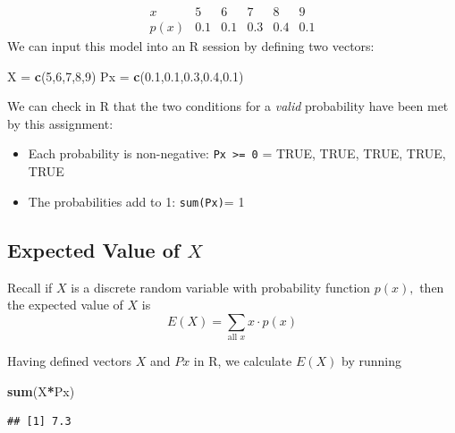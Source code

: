 \documentclass[
]{book}
\newenvironment{Shaded}{\begin{snugshade}}{\end{snugshade}}
\newcommand{\DecValTok}[1]{\textcolor[rgb]{0.00,0.00,0.81}{#1}}
\newcommand{\FloatTok}[1]{\textcolor[rgb]{0.00,0.00,0.81}{#1}}
\newcommand{\FunctionTok}[1]{\textcolor[rgb]{0.13,0.29,0.53}{\textbf{#1}}}
\newcommand{\NormalTok}[1]{#1}
\newcommand{\OtherTok}[1]{\textcolor[rgb]{0.56,0.35,0.01}{#1}}
\newcommand{\SpecialCharTok}[1]{\textcolor[rgb]{0.81,0.36,0.00}{\textbf{#1}}}
\providecommand{\tightlist}{%
  \setlength{\itemsep}{0pt}\setlength{\parskip}{0pt}}
\theoremstyle{definition}
\theoremstyle{definition}
\theoremstyle{definition}
\theoremstyle{definition}
\theoremstyle{remark}
\begin{document}
\[
\begin{array}{c|c|c|c|c|c}
x & 5 & 6 & 7 & 8 & 9 \\ \hline
p(x) & 0.1 & 0.1 & 0.3 & 0.4 & 0.1 
\end{array}
\]
We can input this model into an R session by defining two vectors:

\begin{Shaded}
\begin{Highlighting}[]
\NormalTok{X }\OtherTok{=} \FunctionTok{c}\NormalTok{(}\DecValTok{5}\NormalTok{,}\DecValTok{6}\NormalTok{,}\DecValTok{7}\NormalTok{,}\DecValTok{8}\NormalTok{,}\DecValTok{9}\NormalTok{)}
\NormalTok{Px }\OtherTok{=} \FunctionTok{c}\NormalTok{(}\FloatTok{0.1}\NormalTok{,}\FloatTok{0.1}\NormalTok{,}\FloatTok{0.3}\NormalTok{,}\FloatTok{0.4}\NormalTok{,}\FloatTok{0.1}\NormalTok{)}
\end{Highlighting}
\end{Shaded}

We can check in R that the two conditions for a \emph{valid} probability have been met by this assignment:

\begin{itemize}
\tightlist
\item
  Each probability is non-negative: \texttt{Px\ \textgreater{}=\ 0} = TRUE, TRUE, TRUE, TRUE, TRUE
\item
  The probabilities add to 1: \texttt{sum(Px)}= 1
\end{itemize}

\subsection*{\texorpdfstring{Expected Value of \(X\)}{Expected Value of X}}\label{expected-value-of-x}

Recall if \(X\) is a discrete random variable with probability function \(p(x),\) then the expected value of \(X\) is \[E(X)=\sum_{\text{all }x}x\cdot p(x)\]

Having defined vectors \(X\) and \(Px\) in R, we calculate \(E(X)\) by running

\begin{Shaded}
\begin{Highlighting}[]
\FunctionTok{sum}\NormalTok{(X}\SpecialCharTok{*}\NormalTok{Px) }
\end{Highlighting}
\end{Shaded}

\begin{verbatim}
## [1] 7.3
\end{verbatim}
\end{document}
